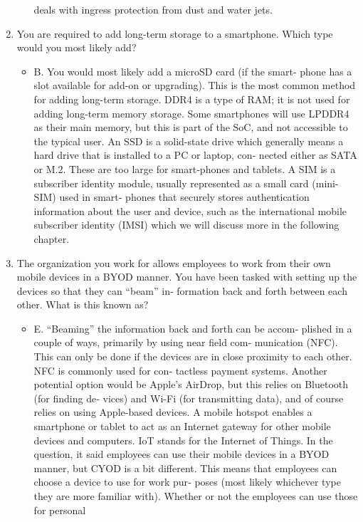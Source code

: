 \documentclass{article}
\begin{document}
\begin{enumerate}
\begin{enumerate}
deals with ingress protection from dust and water jets.
    \end{enumerate}
    \item You are required to add long-term storage to a smartphone.
Which type would you most likely add?
    \begin{itemize}
        \item B. You would most likely add a microSD card (if the smart‐
phone has a slot available for add-on or upgrading). This is the
most common method for adding long-term storage. DDR4 is
a type of RAM; it is not used for adding long-term memory
storage. Some smartphones will use LPDDR4 as their main
memory, but this is part of the SoC, and not accessible to the
typical user. An SSD is a solid-state drive which generally
means a hard drive that is installed to a PC or laptop, con‐
nected either as SATA or M.2. These are too large for smart‐phones and tablets. A SIM is a subscriber identity module,
usually represented as a small card (mini-SIM) used in smart‐
phones that securely stores authentication information about
the user and device, such as the international mobile subscriber
identity (IMSI) which we will discuss more in the following
chapter.
    \end{itemize}
    \item The organization you work for allows employees to work from
their own mobile devices in a BYOD manner. You have been
tasked with setting up the devices so that they can “beam” in‐
formation back and forth between each other. What is this
known as?
    \begin{itemize}
        \item E. “Beaming” the information back and forth can be accom‐
plished in a couple of ways, primarily by using near field com‐
munication (NFC). This can only be done if the devices are in
close proximity to each other. NFC is commonly used for con‐
tactless payment systems. Another potential option would be
Apple’s AirDrop, but this relies on Bluetooth (for finding de‐
vices) and Wi-Fi (for transmitting data), and of course relies
on using Apple-based devices. A mobile hotspot enables a
smartphone or tablet to act as an Internet gateway for other
mobile devices and computers. IoT stands for the Internet of
Things. In the question, it said employees can use their mobile
devices in a BYOD manner, but CYOD is a bit different. This
means that employees can choose a device to use for work pur‐
poses (most likely whichever type they are more familiar
with). Whether or not the employees can use those for personal

\end{itemize}
\end{enumerate}
\end{document}
